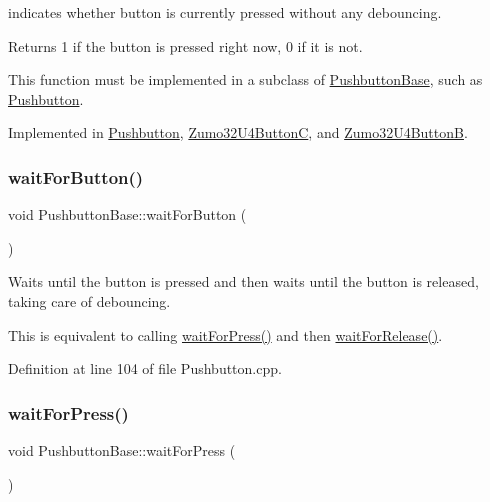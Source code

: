 indicates whether button is currently pressed without any debouncing. 

\begin{DoxyReturn}{Returns}
1 if the button is pressed right now, 0 if it is not.
\end{DoxyReturn}
This function must be implemented in a subclass of \hyperlink{class_pushbutton_base}{Pushbutton\+Base}, such as \hyperlink{class_pushbutton}{Pushbutton}. 

Implemented in \hyperlink{class_pushbutton_a4990786220489fb5b6cf3af19b601a24}{Pushbutton}, \hyperlink{class_zumo32_u4_button_c_aa75e220cde340487a3fa8f1f99d645f8}{Zumo32\+U4\+ButtonC}, and \hyperlink{class_zumo32_u4_button_b_a013a2c0029356aece18b93963373a736}{Zumo32\+U4\+ButtonB}.

\mbox{\label{class_pushbutton_base_ab755065c930be0649597220316213e8a}} 
\subsubsection{\texorpdfstring{wait\+For\+Button()}{waitForButton()}}
{\footnotesize\ttfamily void Pushbutton\+Base\+::wait\+For\+Button (\begin{DoxyParamCaption}{ }\end{DoxyParamCaption})}



Waits until the button is pressed and then waits until the button is released, taking care of debouncing. 

This is equivalent to calling \hyperlink{class_pushbutton_base_a2e2787595c82ee0913ecf4c1eea4a2c8}{wait\+For\+Press()} and then \hyperlink{class_pushbutton_base_ae5fff34b3e1ebd62fd02b99edd6bf13a}{wait\+For\+Release()}. 

Definition at line 104 of file Pushbutton.\+cpp.

\mbox{\label{class_pushbutton_base_a2e2787595c82ee0913ecf4c1eea4a2c8}} 
\subsubsection{\texorpdfstring{wait\+For\+Press()}{waitForPress()}}
{\footnotesize\ttfamily void Pushbutton\+Base\+::wait\+For\+Press (\begin{DoxyParamCaption}{ }\end{DoxyParamCaption})}



